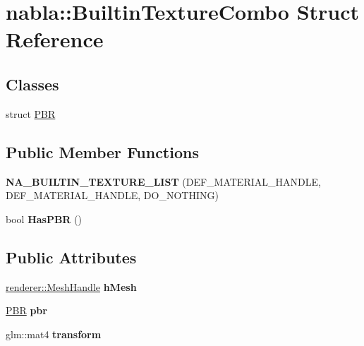 \hypertarget{structnabla_1_1_builtin_texture_combo}{}\section{nabla\+::Builtin\+Texture\+Combo Struct Reference}
\label{structnabla_1_1_builtin_texture_combo}
\subsection*{Classes}
\begin{DoxyCompactItemize}
\item 
struct \mbox{\hyperlink{structnabla_1_1_builtin_texture_combo_1_1_p_b_r}{P\+BR}}
\end{DoxyCompactItemize}
\subsection*{Public Member Functions}
\begin{DoxyCompactItemize}
\item 
\mbox{\label{structnabla_1_1_builtin_texture_combo_a45585bc7184ab2f3ca5518f233601fa2}} 
{\bfseries N\+A\+\_\+\+B\+U\+I\+L\+T\+I\+N\+\_\+\+T\+E\+X\+T\+U\+R\+E\+\_\+\+L\+I\+ST} (D\+E\+F\+\_\+\+M\+A\+T\+E\+R\+I\+A\+L\+\_\+\+H\+A\+N\+D\+LE, D\+E\+F\+\_\+\+M\+A\+T\+E\+R\+I\+A\+L\+\_\+\+H\+A\+N\+D\+LE, D\+O\+\_\+\+N\+O\+T\+H\+I\+NG)
\item 
\mbox{\label{structnabla_1_1_builtin_texture_combo_a4126a9b89616b27b2ee8b461245d0a58}} 
bool {\bfseries Has\+P\+BR} ()
\end{DoxyCompactItemize}
\subsection*{Public Attributes}
\begin{DoxyCompactItemize}
\item 
\mbox{\label{structnabla_1_1_builtin_texture_combo_ab97d91ab53e7180f8c038e9023c04c71}} 
\mbox{\hyperlink{classnabla_1_1renderer_1_1_handle}{renderer\+::\+Mesh\+Handle}} {\bfseries h\+Mesh}
\item 
\mbox{\label{structnabla_1_1_builtin_texture_combo_a86f7a5f0c52f2d4ae6ed2174af6d5148}} 
\mbox{\hyperlink{structnabla_1_1_builtin_texture_combo_1_1_p_b_r}{P\+BR}} {\bfseries pbr}
\item 
\mbox{\label{structnabla_1_1_builtin_texture_combo_a192c37ffe41d4e912b478d2ae171d97b}} 
glm\+::mat4 {\bfseries transform}
\end{DoxyCompactItemize}


